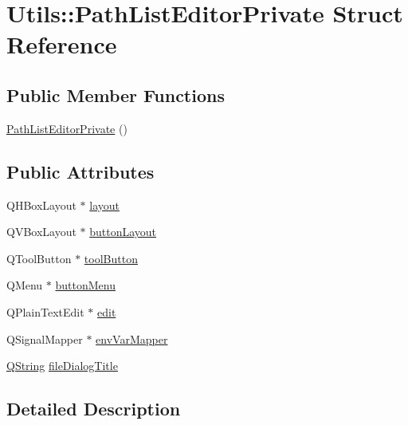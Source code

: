 \hypertarget{struct_utils_1_1_path_list_editor_private}{\section{Utils\-:\-:Path\-List\-Editor\-Private Struct Reference}
\label{struct_utils_1_1_path_list_editor_private}
}
\subsection*{Public Member Functions}
\begin{DoxyCompactItemize}
\item 
\hyperlink{struct_utils_1_1_path_list_editor_private_a27e2c9f78f4ffa7ff3c360f853fe0992}{Path\-List\-Editor\-Private} ()
\end{DoxyCompactItemize}
\subsection*{Public Attributes}
\begin{DoxyCompactItemize}
\item 
Q\-H\-Box\-Layout $\ast$ \hyperlink{struct_utils_1_1_path_list_editor_private_a49b0f4d77c005208d794903fbad89fba}{layout}
\item 
Q\-V\-Box\-Layout $\ast$ \hyperlink{struct_utils_1_1_path_list_editor_private_a47a6d7d811779ccd77d89784f15a14c8}{button\-Layout}
\item 
Q\-Tool\-Button $\ast$ \hyperlink{struct_utils_1_1_path_list_editor_private_a885b729d9ae52f2f5eb13193cffd76e5}{tool\-Button}
\item 
Q\-Menu $\ast$ \hyperlink{struct_utils_1_1_path_list_editor_private_aa6810f68a0cfbba0afdaea4e6e6746a8}{button\-Menu}
\item 
Q\-Plain\-Text\-Edit $\ast$ \hyperlink{struct_utils_1_1_path_list_editor_private_a31a2699dec0693dade54946d3793241e}{edit}
\item 
Q\-Signal\-Mapper $\ast$ \hyperlink{struct_utils_1_1_path_list_editor_private_a20a73b993eb36ec2ecd25527d274f962}{env\-Var\-Mapper}
\item 
\hyperlink{group___u_a_v_objects_plugin_gab9d252f49c333c94a72f97ce3105a32d}{Q\-String} \hyperlink{struct_utils_1_1_path_list_editor_private_a7f99e038e914397b7afcb6d35eff0142}{file\-Dialog\-Title}
\end{DoxyCompactItemize}


\subsection{Detailed Description}



